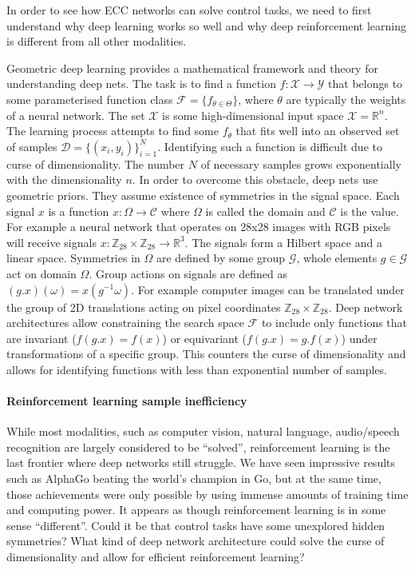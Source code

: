 \documentclass[12pt]{article}
\begin{document}
In order to see how ECC networks can solve control tasks, we need to first understand why deep learning works so well and why deep reinforcement learning is different from all other modalities. 

Geometric deep learning provides a mathematical framework and theory for understanding deep nets. The task is to find a function $f:\mathcal{X}\rightarrow\mathcal{Y}$ that belongs to some parameterised function class $\mathcal{F}=\{f_{\theta \in \Theta}\}$, where $\theta$ are typically the weights of a neural network. The set $\mathcal{X}$ is some high-dimensional input space $\mathcal{X}=\mathbb{R}^n$. The learning process attempts to find some $f_\theta$ that fits well into an observed set of samples $\mathcal{D}=\{(x_i,y_i)\}_{i=1}^N$. Identifying such a function is difficult due to curse of dimensionality. The number $N$ of necessary samples grows exponentially with the dimensionality $n$. In order to overcome this obstacle, deep nets use geometric priors. They assume existence of symmetries in the signal space. Each signal $x$ is a function $x:\Omega \rightarrow \mathcal{C}$ where $\Omega$ is called the domain and $\mathcal{C}$ is the value.
For example a neural network that operates on 28x28 images with RGB pixels will receive signals $x:\mathbb{Z}_{28}\times \mathbb{Z}_{28} \rightarrow \mathbb{R}^{3}$. The signals form a Hilbert space and a linear space. Symmetries in $\Omega$ are defined by some group $\mathcal{G}$, whole elements $g\in \mathcal{G}$ act on domain $\Omega$. Group actions on signals are defined as $(g.x)(\omega)=x(g^{-1}\omega)$. For example computer images can be translated under the group of 2D translations acting on pixel coordinates $\mathbb{Z}_{28}\times \mathbb{Z}_{28}$. Deep network architectures allow constraining the search space $\mathcal{F}$ to include only functions that are invariant ($f(g.x)=f(x)$) or equivariant ($f(g.x)=g.f(x)$) under transformations of a specific group. This counters the curse of dimensionality and allows for identifying functions with less than exponential number of samples.

\paragraph{Reinforcement learning sample inefficiency}
While most modalities, such as computer vision, natural language, audio/speech recognition are largely considered to be ``solved'', reinforcement learning is the last frontier where deep networks still struggle. We have seen impressive results such as AlphaGo beating the world's champion in Go, but at the same time, those achievements were only possible by using immense amounts of training time and computing power. It appears as though reinforcement learning is in some sense ``different''. Could it be that control tasks have some unexplored hidden symmetries? What kind of deep network architecture could solve the curse of dimensionality and allow for efficient reinforcement learning?
\end{document}
